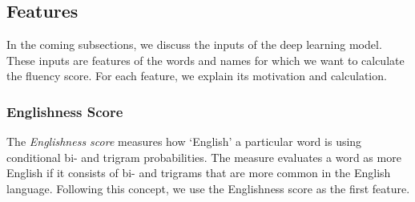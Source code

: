 \documentclass[11pt]{article}
\begin{document}
\subsection{Features}
In the coming subsections, we discuss the inputs of the deep learning model. These inputs are features of the words and names for which we want to calculate the fluency score. For each feature, we explain its motivation and calculation.

\subsubsection{Englishness Score}
The \textit{Englishness score} \citep{travers1978pronounceability} measures how `English' a particular word is using conditional bi- and trigram probabilities. The measure evaluates a word as more English if it consists of bi- and trigrams that are more common in the English language. Following this concept, we use the Englishness score as the first feature. 
\end{document}
